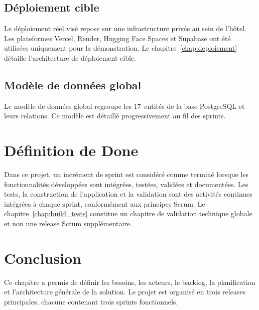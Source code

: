 \subsection{Déploiement cible}
Le déploiement réel visé repose sur une infrastructure privée au sein de l'hôtel. Les plateformes Vercel, Render, Hugging Face Spaces et Supabase ont été utilisées uniquement pour la démonstration. Le chapitre~\ref{chap:deploiement} détaille l'architecture de déploiement cible.


\subsection{Modèle de données global}
Le modèle de données global regroupe les 17~entités de la base PostgreSQL et leurs relations. Ce modèle est détaillé progressivement au fil des sprints.


\section{Définition de Done}
Dans ce projet, un incrément de sprint est considéré comme terminé lorsque les fonctionnalités développées sont intégrées, testées, validées et documentées. Les tests, la construction de l'application et la validation sont des activités continues intégrées à chaque sprint, conformément aux principes Scrum. Le chapitre~\ref{chap:build_tests} constitue un chapitre de validation technique globale et non une release Scrum supplémentaire.

\section*{Conclusion}
Ce chapitre a permis de définir les besoins, les acteurs, le backlog, la planification et l'architecture générale de la solution. Le projet est organisé en trois releases principales, chacune contenant trois sprints fonctionnels.

